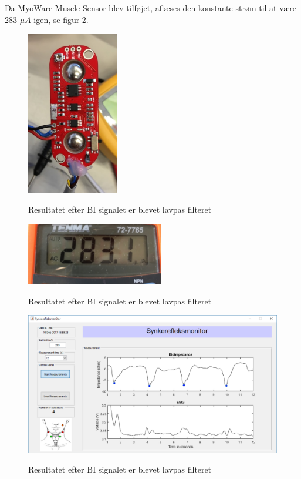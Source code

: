 Da MyoWare Muscle Sensor blev tilføjet, aflæses den konstante strøm til at være 283 $\mu A$ igen, se figur \ref{fig:integrationstestVCCSud2}.


\begin{figure}[H] 
\centering
{\includegraphics[width=4cm]
{Figure/myoware}}
\caption{Resultatet efter BI signalet er blevet lavpas filteret}
\label{fig:myoware}
\end{figure}

\begin{figure}[H] 
\centering
{\includegraphics[width=6cm]
{Figure/integrationstestVCCSud}}
\caption{Resultatet efter BI signalet er blevet lavpas filteret}
\label{fig:integrationstestVCCSud2}
\end{figure}





\begin{figure}[H] 
\centering
{\includegraphics[width=\linewidth]
{Figure/guiDone}}
\caption{Resultatet efter BI signalet er blevet lavpas filteret}
\label{fig:guiDone}
\end{figure}






